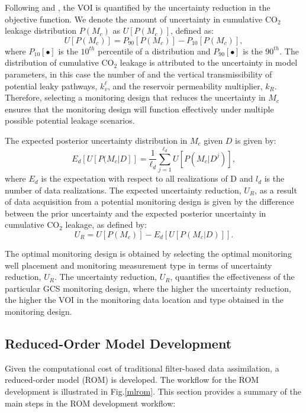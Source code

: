 \documentclass[a4paper,fleqn]{cas-sc}
\begin{document}
Following \citet{Chen2017328, Chen2018} and \citet{Le2014505}, the VOI is quantified by the uncertainty reduction in the objective function. We denote the amount of uncertainty in cumulative CO$_2$ leakage distribution $P(M_c)$ as $U[P(M_c)]$, defined as:
\begin{equation} \label{eq:1}
    U[P(M_c)] = P_{90}[P(M_c)] - P_{10}[P(M_c)] ,
\end{equation}
where $P_{10}[\bullet]$ is the $10^{th}$ percentile of a distribution and $P_{90}[\bullet]$ is the $90^{th}$. The distribution of cumulative CO$_2$ leakage is attributed to the uncertainty in model parameters, in this case the number of and the vertical transmissibility of potential leaky pathways, $k_v^\ell$, and the reservoir permeability multiplier, $k_R$. Therefore, selecting a monitoring design that reduces the uncertainty in $M_c$ ensures that the monitoring design will function effectively under multiple possible potential leakage scenarios.

The expected posterior uncertainty distribution in $M_c$ given $D$ is given by:
\begin{equation} \label{eq:2}
    E_d [U [ P(M_c \vert D]] = \frac{1}{\ell_d} \sum_{j=1}^{\ell_d} U [P (M_c \vert D^j) ] ,
\end{equation}
where $E_d$ is the expectation with respect to all realizations of D and $l_d$ is the number of data realizations. The expected uncertainty reduction, $U_R$, as a result of data acquisition from a potential monitoring design is given by the difference between the prior uncertainty and the expected posterior uncertainty in cumulative CO$_2$ leakage, as defined by:
\begin{equation} \label{eq:3}
    U_R = U[P(M_c)] - E_d [U [ P(M_c \vert D)]] .
\end{equation}

The optimal monitoring design is obtained by selecting the optimal monitoring well placement and monitoring measurement type in terms of uncertainty reduction, $U_R$. The uncertainty reduction, $U_R$, quantifies the effectiveness of the particular GCS monitoring design, where the higher the uncertainty reduction, the higher the VOI in the monitoring data location and type obtained in the monitoring design.

\subsection{Reduced-Order Model Development}
Given the computational cost of traditional filter-based data assimilation, a reduced-order model (ROM) is developed. The workflow for the ROM development is illustrated in Fig.\ref{mlrom}. This section provides a summary of the main steps in the ROM development workflow:
\end{document}
